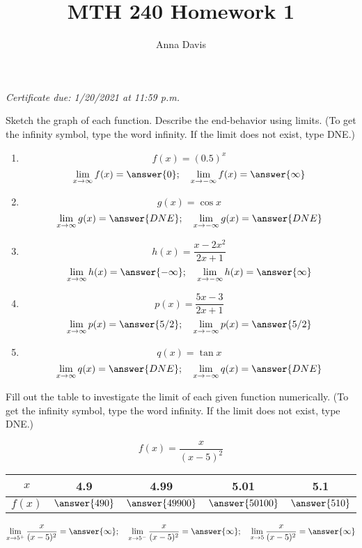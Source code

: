 \documentclass{ximera}
\author{Anna Davis} \title{MTH 240 Homework 1}
\begin{document}
\begin{abstract}

\end{abstract}
\maketitle
 \textit{Certificate due: 1/20/2021 at 11:59 p.m.}
\begin{problem}\label{prob:240hom1prob1}
Sketch the graph of each function.  Describe the end-behavior using limits.  (To get the infinity symbol, type the word infinity. If the limit does not exist, type DNE.)
\begin{enumerate}
    \item $$f(x)=(0.5)^x$$
    $$\lim_{x\to\infty}f(x)=\answer{0};\quad \lim_{x\to-\infty}f(x)=\answer{\infty}$$
    \item $$g(x)=\cos x$$
    $$\lim_{x\to\infty}g(x)=\answer{DNE};\quad \lim_{x\to-\infty}g(x)=\answer{DNE}$$
    \item $$h(x)=\frac{x-2x^2}{2x+1}$$
    $$\lim_{x\to\infty}h(x)=\answer{-\infty};\quad \lim_{x\to-\infty}h(x)=\answer{\infty}$$
    \item $$p(x)=\frac{5x-3}{2x+1}$$
    $$\lim_{x\to\infty}p(x)=\answer{5/2};\quad \lim_{x\to-\infty}p(x)=\answer{5/2}$$
    \item $$q(x)=\tan x$$
    $$\lim_{x\to\infty}q(x)=\answer{DNE};\quad \lim_{x\to-\infty}q(x)=\answer{DNE}$$
\end{enumerate}
   \end{problem}

\begin{problem}\label{prob:240hom1prob2}
Fill out the table to investigate the limit of each given function numerically.  (To get the infinity symbol, type the word infinity. If the limit does not exist, type DNE.)

    $$f(x)=\frac{x}{(x-5)^2}$$
    \begin{center}
    \begin{tabular}{|c|c|c|c|c|}
         $x$ & 4.9 & 4.99 & 5.01 & 5.1  \\
         \hline
         $f(x)$ & $\answer{490}$ & $\answer{49900}$ & $\answer{50100}$ & $\answer{510}$ 
    \end{tabular}
    \end{center}
    $$\lim_{x\to 5^+}\frac{x}{(x-5)^2}=\answer{\infty};\quad \lim_{x\to 5^-}\frac{x}{(x-5)^2}=\answer{\infty};\quad \lim_{x\to 5}\frac{x}{(x-5)^2}=\answer{\infty}$$
    \end{problem}
\end{document}
